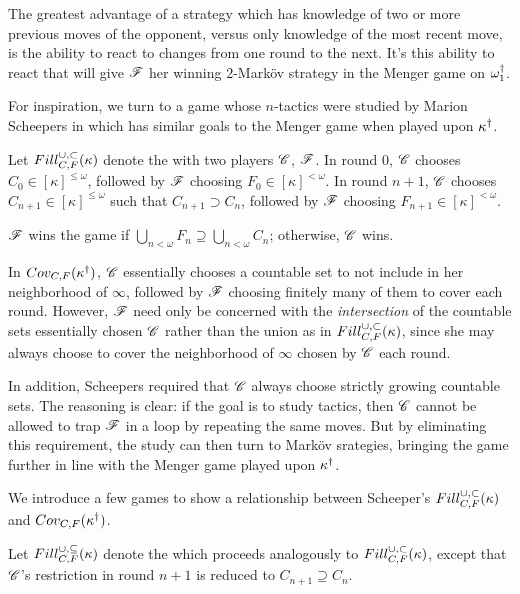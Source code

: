 The greatest advantage of a strategy which has knowledge of two or more previous
moves of the opponent, versus only knowledge of the most recent move, is the
ability to react to changes from one round to the next. It's this ability to
react that will give $\mathscr{F}$ her winning $2$-Mark\"ov strategy in the Menger
game on $\omega^\dagger_1$.

For inspiration, we turn to a game whose $n$-tactics were studied by Marion
Scheepers in \cite{MR1129143} which has similar goals to the Menger game when
played upon $\kappa^\dagger$.

\begin{game}
  Let $Fill^{\cup,\subset}_{C,F}(\kappa)$ denote the 
  with two players $\mathscr{C}$, $\mathscr{F}$. In round $0$, $\mathscr{C}$ chooses
  $C_0\in[\kappa]^{\leq\omega}$, followed by $\mathscr{F}$ choosing
  $F_0\in[\kappa]^{<\omega}$. In round $n+1$, $\mathscr{C}$ chooses
  $C_{n+1}\in[\kappa]^{\leq\omega}$ such that $C_{n+1}\supset C_n$, followed
  by $\mathscr{F}$ choosing $F_{n+1}\in[\kappa]^{<\omega}$.

  $\mathscr{F}$ wins the game if
  $\bigcup_{n<\omega} F_n\supseteq\bigcup_{n<\omega} C_n$; otherwise, $\mathscr{C}$
  wins.
\end{game}

In $Cov_{C,F}(\kappa^\dagger)$, $\mathscr{C}$ essentially chooses a countable set
to not include in her neighborhood of $\infty$, followed by $\mathscr{F}$ choosing
finitely many of them to cover each round. However,
$\mathscr{F}$ need only be concerned with the \textit{intersection} of the
countable sets essentially chosen $\mathscr{C}$ rather than the union as in
$Fill^{\cup,\subset}_{C,F}(\kappa)$, since she may always choose to cover the neighborhood of
$\infty$ chosen by $\mathscr{C}$ each round.

In addition, Scheepers required that $\mathscr{C}$ always choose strictly growing
countable sets. The reasoning is clear: if the goal is to study tactics, then
$\mathscr{C}$ cannot be allowed to trap $\mathscr{F}$ in a loop by repeating the same moves.
But by eliminating this requirement, the study can then turn to Mark\"ov
srategies, bringing the game further in line with the Menger game played upon
$\kappa^\dagger$.

We introduce a few games to show a relationship between Scheeper's
$Fill^{\cup,\subset}_{C,F}(\kappa)$ and $Cov_{C,F}(\kappa^\dagger)$.

\begin{game}
  Let $Fill^{\cup,\subseteq}_{C,F}(\kappa)$ denote the
   which proceeds analogously
  to $Fill^{\cup,\subset}_{C,F}(\kappa)$, except that $\mathscr{C}$'s restriction in round $n+1$
  is reduced to $C_{n+1}\supseteq C_n$.
\end{game}

